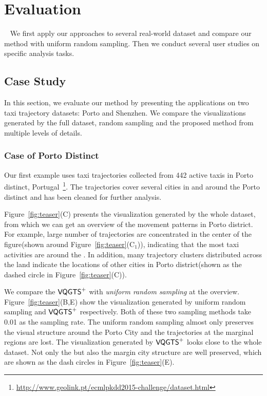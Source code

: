 \section{Evaluation}~\label{sec:exp}
We first apply our approaches to several real-world dataset and compare our method with uniform random sampling. Then we conduct several user studies on specific analysis tasks. 
\subsection{Case Study}
In this section, we evaluate our method by presenting the applications on two taxi trajectory datasets: Porto and Shenzhen. We compare the visualizations generated by the full dataset, random sampling and the proposed method from multiple levels of details. 
\subsubsection{Case of Porto Distinct}
Our first example uses taxi trajectories collected from 442 active taxis in Porto distinct, Portugal~\footnote{\url{http://www.geolink.pt/ecmlpkdd2015-challenge/dataset.html}}. The trajectories cover several cities in and around the Porto distinct and has been cleaned for further analysis.


Figure~\ref{fig:teaser}(C) presents the visualization generated by the whole dataset, from which we can get an overview of the movement patterns in Porto district. For example, large number of trajectories are concentrated in the center of the figure(shown around Figure~\ref{fig:teaser}(C$_1$)), indicating that the most taxi activities are around the . In addition, 
many trajectory clusters distributed across the land indicate the locations of other cities in Porto district(shown as the dashed circle in Figure~\ref{fig:teaser}(C)). 

We compare the $\mathsf{VQGTS}^{+}$ with \textit{uniform random sampling} at the overview. 
Figure~\ref{fig:teaser}(B,E) show the visualization generated by uniform random sampling and $\mathsf{VQGTS}^{+}$ respectively. Both of these two sampling methods take 0.01 as the sampling rate. The uniform random sampling almost only preserves the visual structure around the Porto City and the trajectories at the marginal regions are lost.
The visualization generated by $\mathsf{VQGTS}^{+}$ looks close to the whole dataset. Not only the  but also the margin city structure are well preserved, which are shown as the dash circles in Figure~\ref{fig:teaser}(E).
 
